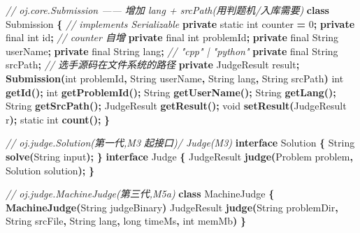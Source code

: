 \documentclass[
  11pt,
]{ctexart}
\newenvironment{Shaded}{\begin{snugshade}}{\end{snugshade}}
\newcommand{\BuiltInTok}[1]{#1}
\newcommand{\CommentTok}[1]{\textcolor[rgb]{0.56,0.35,0.01}{\textit{#1}}}
\newcommand{\DataTypeTok}[1]{\textcolor[rgb]{0.13,0.29,0.53}{#1}}
\newcommand{\DecValTok}[1]{\textcolor[rgb]{0.00,0.00,0.81}{#1}}
\newcommand{\FunctionTok}[1]{\textcolor[rgb]{0.13,0.29,0.53}{\textbf{#1}}}
\newcommand{\KeywordTok}[1]{\textcolor[rgb]{0.13,0.29,0.53}{\textbf{#1}}}
\newcommand{\NormalTok}[1]{#1}
\newcommand{\OperatorTok}[1]{\textcolor[rgb]{0.81,0.36,0.00}{\textbf{#1}}}
\begin{document}
\begin{Shaded}
\begin{Highlighting}[]
\CommentTok{// oj.core.Submission  —— 增加 lang + srcPath(用判题机/入库需要)}
\KeywordTok{class}\NormalTok{ Submission }\OperatorTok{\{}                            \CommentTok{// implements Serializable}
    \KeywordTok{private} \DataTypeTok{static} \DataTypeTok{int}\NormalTok{ counter }\OperatorTok{=} \DecValTok{0}\OperatorTok{;}
    \KeywordTok{private} \DataTypeTok{final} \DataTypeTok{int}\NormalTok{ id}\OperatorTok{;}                     \CommentTok{// counter 自增}
    \KeywordTok{private} \DataTypeTok{final} \DataTypeTok{int}\NormalTok{ problemId}\OperatorTok{;}
    \KeywordTok{private} \DataTypeTok{final} \BuiltInTok{String}\NormalTok{ userName}\OperatorTok{;}
    \KeywordTok{private} \DataTypeTok{final} \BuiltInTok{String}\NormalTok{ lang}\OperatorTok{;}                \CommentTok{// "cpp" | "python"}
    \KeywordTok{private} \DataTypeTok{final} \BuiltInTok{String}\NormalTok{ srcPath}\OperatorTok{;}             \CommentTok{// 选手源码在文件系统的路径}
    \KeywordTok{private}\NormalTok{ JudgeResult result}\OperatorTok{;}
    \FunctionTok{Submission}\OperatorTok{(}\DataTypeTok{int}\NormalTok{ problemId}\OperatorTok{,} \BuiltInTok{String}\NormalTok{ userName}\OperatorTok{,} \BuiltInTok{String}\NormalTok{ lang}\OperatorTok{,} \BuiltInTok{String}\NormalTok{ srcPath}\OperatorTok{)}
    \DataTypeTok{int} \FunctionTok{getId}\OperatorTok{();} \DataTypeTok{int} \FunctionTok{getProblemId}\OperatorTok{();} \BuiltInTok{String} \FunctionTok{getUserName}\OperatorTok{();} \BuiltInTok{String} \FunctionTok{getLang}\OperatorTok{();} \BuiltInTok{String} \FunctionTok{getSrcPath}\OperatorTok{();}
\NormalTok{    JudgeResult }\FunctionTok{getResult}\OperatorTok{();} \DataTypeTok{void} \FunctionTok{setResult}\OperatorTok{(}\NormalTok{JudgeResult r}\OperatorTok{);}
    \DataTypeTok{static} \DataTypeTok{int} \FunctionTok{count}\OperatorTok{();}
\OperatorTok{\}}

\CommentTok{// oj.judge.Solution(第一代,M3 起接口)/ Judge(M3)}
\KeywordTok{interface}\NormalTok{ Solution }\OperatorTok{\{} \BuiltInTok{String} \FunctionTok{solve}\OperatorTok{(}\BuiltInTok{String}\NormalTok{ input}\OperatorTok{);} \OperatorTok{\}}
\KeywordTok{interface}\NormalTok{ Judge }\OperatorTok{\{}\NormalTok{ JudgeResult }\FunctionTok{judge}\OperatorTok{(}\NormalTok{Problem problem}\OperatorTok{,}\NormalTok{ Solution solution}\OperatorTok{);} \OperatorTok{\}}

\CommentTok{// oj.judge.MachineJudge(第三代,M5a)}
\KeywordTok{class}\NormalTok{ MachineJudge }\OperatorTok{\{}
    \FunctionTok{MachineJudge}\OperatorTok{(}\BuiltInTok{String}\NormalTok{ judgeBinary}\OperatorTok{)}
\NormalTok{    JudgeResult }\FunctionTok{judge}\OperatorTok{(}\BuiltInTok{String}\NormalTok{ problemDir}\OperatorTok{,} \BuiltInTok{String}\NormalTok{ srcFile}\OperatorTok{,} \BuiltInTok{String}\NormalTok{ lang}\OperatorTok{,} \DataTypeTok{long}\NormalTok{ timeMs}\OperatorTok{,} \DataTypeTok{int}\NormalTok{ memMb}\OperatorTok{)}
\OperatorTok{\}}
\end{Highlighting}
\end{Shaded}
\end{document}
